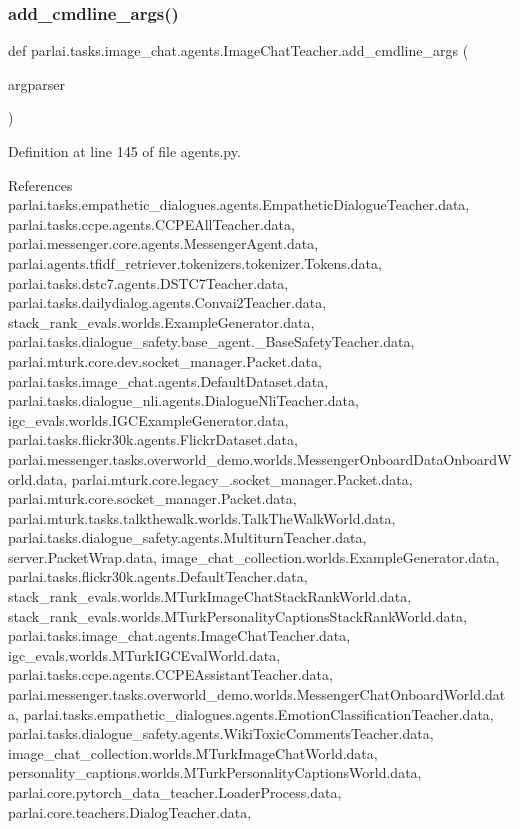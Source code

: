 \subsubsection{\texorpdfstring{add\+\_\+cmdline\+\_\+args()}{add\_cmdline\_args()}}
{\footnotesize\ttfamily def parlai.\+tasks.\+image\+\_\+chat.\+agents.\+Image\+Chat\+Teacher.\+add\+\_\+cmdline\+\_\+args (\begin{DoxyParamCaption}\item[{}]{argparser }\end{DoxyParamCaption})\hspace{0.3cm}{\ttfamily [static]}}



Definition at line 145 of file agents.\+py.



References parlai.\+tasks.\+empathetic\+\_\+dialogues.\+agents.\+Empathetic\+Dialogue\+Teacher.\+data, parlai.\+tasks.\+ccpe.\+agents.\+C\+C\+P\+E\+All\+Teacher.\+data, parlai.\+messenger.\+core.\+agents.\+Messenger\+Agent.\+data, parlai.\+agents.\+tfidf\+\_\+retriever.\+tokenizers.\+tokenizer.\+Tokens.\+data, parlai.\+tasks.\+dstc7.\+agents.\+D\+S\+T\+C7\+Teacher.\+data, parlai.\+tasks.\+dailydialog.\+agents.\+Convai2\+Teacher.\+data, stack\+\_\+rank\+\_\+evals.\+worlds.\+Example\+Generator.\+data, parlai.\+tasks.\+dialogue\+\_\+safety.\+base\+\_\+agent.\+\_\+\+Base\+Safety\+Teacher.\+data, parlai.\+mturk.\+core.\+dev.\+socket\+\_\+manager.\+Packet.\+data, parlai.\+tasks.\+image\+\_\+chat.\+agents.\+Default\+Dataset.\+data, parlai.\+tasks.\+dialogue\+\_\+nli.\+agents.\+Dialogue\+Nli\+Teacher.\+data, igc\+\_\+evals.\+worlds.\+I\+G\+C\+Example\+Generator.\+data, parlai.\+tasks.\+flickr30k.\+agents.\+Flickr\+Dataset.\+data, parlai.\+messenger.\+tasks.\+overworld\+\_\+demo.\+worlds.\+Messenger\+Onboard\+Data\+Onboard\+World.\+data, parlai.\+mturk.\+core.\+legacy\+\_.\+socket\+\_\+manager.\+Packet.\+data, parlai.\+mturk.\+core.\+socket\+\_\+manager.\+Packet.\+data, parlai.\+mturk.\+tasks.\+talkthewalk.\+worlds.\+Talk\+The\+Walk\+World.\+data, parlai.\+tasks.\+dialogue\+\_\+safety.\+agents.\+Multiturn\+Teacher.\+data, server.\+Packet\+Wrap.\+data, image\+\_\+chat\+\_\+collection.\+worlds.\+Example\+Generator.\+data, parlai.\+tasks.\+flickr30k.\+agents.\+Default\+Teacher.\+data, stack\+\_\+rank\+\_\+evals.\+worlds.\+M\+Turk\+Image\+Chat\+Stack\+Rank\+World.\+data, stack\+\_\+rank\+\_\+evals.\+worlds.\+M\+Turk\+Personality\+Captions\+Stack\+Rank\+World.\+data, parlai.\+tasks.\+image\+\_\+chat.\+agents.\+Image\+Chat\+Teacher.\+data, igc\+\_\+evals.\+worlds.\+M\+Turk\+I\+G\+C\+Eval\+World.\+data, parlai.\+tasks.\+ccpe.\+agents.\+C\+C\+P\+E\+Assistant\+Teacher.\+data, parlai.\+messenger.\+tasks.\+overworld\+\_\+demo.\+worlds.\+Messenger\+Chat\+Onboard\+World.\+data, parlai.\+tasks.\+empathetic\+\_\+dialogues.\+agents.\+Emotion\+Classification\+Teacher.\+data, parlai.\+tasks.\+dialogue\+\_\+safety.\+agents.\+Wiki\+Toxic\+Comments\+Teacher.\+data, image\+\_\+chat\+\_\+collection.\+worlds.\+M\+Turk\+Image\+Chat\+World.\+data, personality\+\_\+captions.\+worlds.\+M\+Turk\+Personality\+Captions\+World.\+data, parlai.\+core.\+pytorch\+\_\+data\+\_\+teacher.\+Loader\+Process.\+data, parlai.\+core.\+teachers.\+Dialog\+Teacher.\+data, 